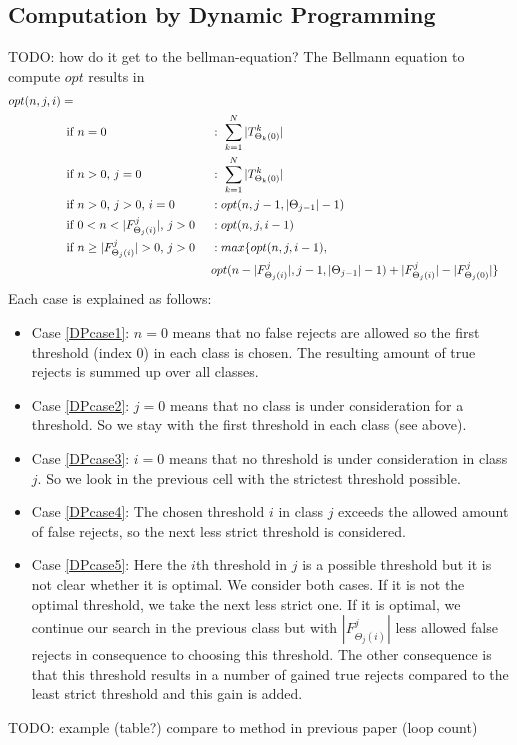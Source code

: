 \subsection{Computation by Dynamic Programming}
TODO: how do it get to the bellman-equation?
The Bellmann equation to compute $opt$ results in
\begin{align}
opt(n,j,i) = \notag \\
\text{if}& \ n=0 \ &&: \ \sum_{k=1}^{N} |T_{\Theta_k(0)}^k| \label{DPcase1}\\
\text{if}& \ n>0\text{,}\ j=0 \ &&: \ \sum_{k=1}^{N} |T_{\Theta_k(0)}^k| \label{DPcase2}\\
\text{if}& \ n>0\text{,}\ j>0\text{,}\ i=0 \ &&: opt(n,j-1,|\Theta_{j-1}|-1) \label{DPcase3}\\
\text{if}& \ 0<n<|F_{\Theta_j(i)}^j|\text{,}\ j>0 \ &&: opt(n,j,i-1) \label{DPcase4}\\
\text{if}& \ n \geq |F_{\Theta_j(i)}^j|>0\text{,}\ j>0 \ &&: max\{opt(n,j,i-1), \notag \\
& && opt(n-|F_{\Theta_j(i)}^j|,j-1,|\Theta_{j-1}|-1)+|F_{\Theta_j(i)}^j|-|F_{\Theta_j(0)}^j|\} \label{DPcase5}
\end{align}
Each case is explained as follows:
\begin{itemize}
\item Case \ref{DPcase1}: $n=0$ means that no false rejects are allowed so the first threshold (index 0) in each class is chosen. The resulting amount of true rejects is summed up over all classes.
\item Case \ref{DPcase2}: $j=0$ means that no class is under consideration for a threshold. So we stay with the first threshold in each class (see above). 
\item Case \ref{DPcase3}: $i=0$ means that no threshold is under consideration in class $j$. So we look in the previous cell with the strictest threshold possible.
\item Case \ref{DPcase4}: The chosen threshold $i$ in class $j$ exceeds the allowed amount of false rejects, so the next less strict threshold is considered.
\item Case \ref{DPcase5}: Here the $i$th threshold in $j$ is a possible threshold but it is not clear whether it is optimal. We consider both cases. If it is not the optimal threshold, we take the next less strict one. If it is optimal, we continue our search in the previous class but with $|F_{\Theta_j(i)}^j|$ less allowed false rejects in consequence to choosing this threshold. The other consequence is that this threshold results in a number of gained true rejects compared to the least strict threshold and this gain is added.
\end{itemize}
TODO: example (table?) compare to method in previous paper (loop count)

